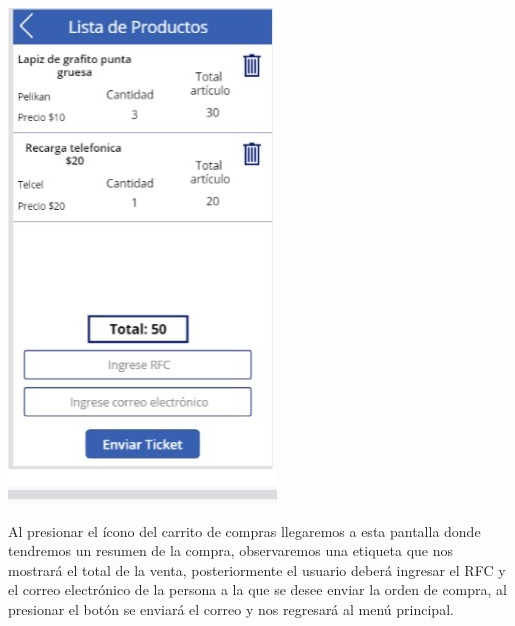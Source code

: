 \documentclass[letter,12pt]{article} %
\begin{document}
\begin{center} 
\includegraphics[scale=0.45]{imagenes/A04.jpeg}
\end{center} 
Al presionar el ícono del carrito de compras llegaremos a esta pantalla donde tendremos un resumen de la compra, observaremos una etiqueta que nos mostrará el total de la venta, posteriormente el usuario deberá ingresar el RFC y el correo electrónico de la persona a la que se desee enviar la orden de compra, al presionar el botón se enviará el correo y nos regresará al menú principal.\\
\end{document}
